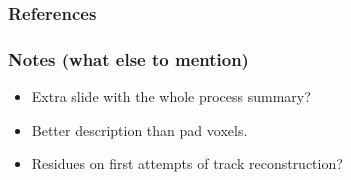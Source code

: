 \documentclass{beamer}
\begin{document}
	\begin{frame}
		\frametitle{References}
		
		
	\end{frame}
	\begin{frame}[noframenumbering]
	\frametitle{Notes (what else to mention)}
		\begin{itemize}
			\item Extra slide with the whole process summary?
			\item Better description than pad voxels.
			\item Residues on first attempts of track reconstruction?
		\end{itemize}
	\end{frame}
	
\end{document}
